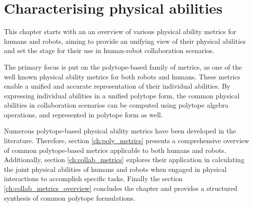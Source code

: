 \chapter{Characterising physical abilities} %

\label{ch:phisical_ability_metrics} %


This chapter starts with an an overview of various physical ability metrics for humans and robots, aiming to provide an unifying view of their physical abilities and set the stage for their use in human-robot collaboration scenarios.

The primary focus is put on the polytope-based family of metrics, as one of the well known physical ability metrics for both robots and humans. These metrics enable a unified and accurate representation of their individual abilities. By expressing individual abilities in a unified polytope form, the common physical abilities in collaboration scenarios can be computed using polytope algebra operations, and represented in polytope form as well.

Numerous polytope-based physical ability metrics have been developed in the literature. Therefore, section \ref{ch:poly_metrics} presents a comprehensive overview of common polytope-based metrics applicable to both humans and robots. Additionally, section \ref{ch:collab_metrics} explores their application in calculating the joint physical abilities of humans and robots when engaged in physical interactions to accomplish specific tasks. Finally the section \ref{ch:collab_metrics_overview} concludes the chapter and provides a structured synthesis of common polytope formulations.



